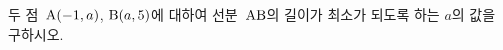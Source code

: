 두 점~$\mathrm{A}(-1{,}\mkern3mu\mathopen{}a)$, $\mathrm{B}(a{,}\mkern3mu\mathopen{}5)$에 대하여 선분~$\mathrm{AB}$의 길이가 최소가 되도록 하는 $a$의 값을 구하시오.
